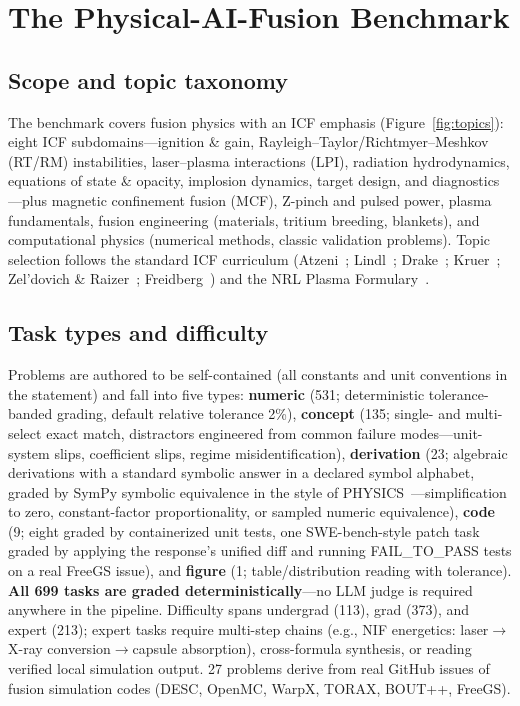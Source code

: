 \section{The Physical-AI-Fusion Benchmark}
\label{sec:benchmark}

\subsection{Scope and topic taxonomy}
The benchmark covers fusion physics with an ICF emphasis (Figure~\ref{fig:topics}): eight ICF subdomains---ignition \& gain, Rayleigh--Taylor/Richtmyer--Meshkov (RT/RM) instabilities, laser--plasma interactions (LPI), radiation hydrodynamics, equations of state \& opacity, implosion dynamics, target design, and diagnostics---plus magnetic confinement fusion (MCF), Z-pinch and pulsed power, plasma fundamentals, fusion engineering (materials, tritium breeding, blankets), and computational physics (numerical methods, classic validation problems). Topic selection follows the standard ICF curriculum (Atzeni~\cite{atzeni2004icf}; Lindl~\cite{lindl1998icf}; Drake~\cite{drake2018hedp}; Kruer~\cite{kruer1988lpi}; Zel'dovich \& Raizer~\cite{zeldovich1966shock}; Freidberg~\cite{freidberg2007fusion}) and the NRL Plasma Formulary~\cite{nrlformulary}.

\subsection{Task types and difficulty}
Problems are authored to be self-contained (all constants and unit conventions in the statement) and fall into five types: \textbf{numeric} (531; deterministic tolerance-banded grading, default relative tolerance 2\%), \textbf{concept} (135; single- and multi-select exact match, distractors engineered from common failure modes---unit-system slips, coefficient slips, regime misidentification), \textbf{derivation} (23; algebraic derivations with a standard symbolic answer in a declared symbol alphabet, graded by SymPy symbolic equivalence in the style of PHYSICS~\cite{feng2025physics}---simplification to zero, constant-factor proportionality, or sampled numeric equivalence), \textbf{code} (9; eight graded by containerized unit tests, one SWE-bench-style patch task graded by applying the response's unified diff and running FAIL\_TO\_PASS tests on a real FreeGS issue), and \textbf{figure} (1; table/distribution reading with tolerance). \textbf{All 699 tasks are graded deterministically}---no LLM judge is required anywhere in the pipeline. Difficulty spans undergrad (113), grad (373), and expert (213); expert tasks require multi-step chains (e.g., NIF energetics: laser$\to$X-ray conversion$\to$capsule absorption), cross-formula synthesis, or reading verified local simulation output. 27 problems derive from real GitHub issues of fusion simulation codes (DESC, OpenMC, WarpX, TORAX, BOUT++, FreeGS).

